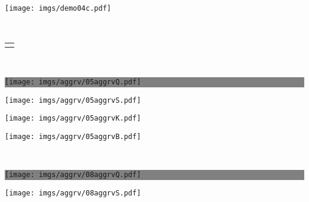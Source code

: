 \begin{figure*}[!ht]
{\begin{minipage}{\subw}
{		  \texttt{[image: imgs/demo04c.pdf]}
		  }
		\end{minipage}
	 }
	 \\
	 \begin{minipage}{0.93\linewidth}
		\centering
		\begin{tabular}{c}
		  \vspace{-3mm}
		  \hspace{\linewidth} \\
		  \hline
		  \vspace{-3mm}
		\end{tabular}
	 \end{minipage}
	 \\
	 \colorbox{gray}{
		\begin{minipage}{\subw}
		  \centerline{
		  \texttt{[image: imgs/aggrv/05aggrvQ.pdf]}
		  }
		\end{minipage}
	 }
	 \hspace{3mm}
	 \colorbox{myRed}{
		\begin{minipage}{\subw}
		  \centerline{
		  \texttt{[image: imgs/aggrv/05aggrvS.pdf]}
		  }
		\end{minipage}
	 }
	 \colorbox{myGreen}{
		\begin{minipage}{\subw}
		  \centerline{
		  \texttt{[image: imgs/aggrv/05aggrvK.pdf]}
		  }
		\end{minipage}
	 }
	 \colorbox{myGreen}{
		\begin{minipage}{\subw}
		  \centerline{
		  \texttt{[image: imgs/aggrv/05aggrvB.pdf]}
		  }
		\end{minipage}
	 }
	 \vspace{1mm}
	 \\
	 \colorbox{gray}{
		\begin{minipage}{\subw}
		  \centerline{
		  \texttt{[image: imgs/aggrv/08aggrvQ.pdf]}
		  }
		\end{minipage}
	 }
	 \hspace{3mm}
	 \colorbox{myRed}{
		\begin{minipage}{\subw}
		  \centerline{
		  \texttt{[image: imgs/aggrv/08aggrvS.pdf]}
		  }
		\end{minipage}
	 }
	 \colorbox{myGreen}{
		\begin{minipage}{\subw}

\end{minipage}}
\end{figure*}
